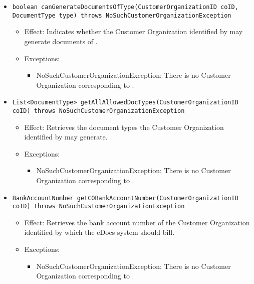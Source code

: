 \begin{itemize}
\begin{itemize}
		\item \texttt{boolean canGenerateDocumentsOfType(CustomerOrganizationID coID, DocumentType type) throws NoSuchCustomerOrganizationException}
		    \begin{itemize}
                \item Effect: Indicates whether the Customer Organization identified by  may generate documents of .
                \item Exceptions:
				\begin{itemize}
					\item NoSuchCustomerOrganizationException: There is no Customer Organization corresponding to .
				\end{itemize}
            \end{itemize}

		\item \texttt{List<DocumentType> getAllAllowedDocTypes(CustomerOrganizationID coID) throws NoSuchCustomerOrganizationException}
		    \begin{itemize}
                \item Effect: Retrieves the document types the Customer Organization identified by  may generate.
                \item Exceptions:
				\begin{itemize}
					\item NoSuchCustomerOrganizationException: There is no Customer Organization corresponding to .
				\end{itemize}
            \end{itemize}

		\item \texttt{BankAccountNumber getCOBankAccountNumber(CustomerOrganizationID coID) throws NoSuchCustomerOrganizationException}
		    \begin{itemize}
                \item Effect: Retrieves the bank account number of the Customer Organization identified by  which the eDocs system should bill.
                \item Exceptions:
				\begin{itemize}
					\item NoSuchCustomerOrganizationException: There is no Customer Organization corresponding to .
				\end{itemize}
            \end{itemize}


\end{itemize}
\end{itemize}
